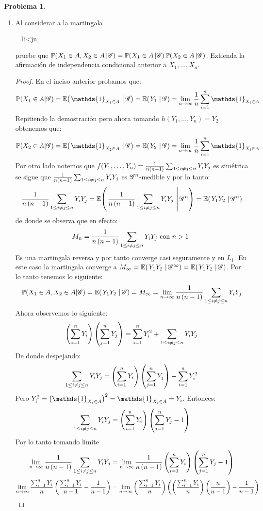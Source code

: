 \documentclass[a5paper,oneside]{amsart}
\theoremstyle{plain}
\theoremstyle{definition}
\newtheorem{problema}{Problema}
\begin{document}
\begin{problema}
\begin{enumerate}
\item Al considerar a la martingala\begin{esn}
\sum_{1\leq i<j\leq n},
\end{esn}pruebe que $\mathbb{P}\! \left( X_1\in A,X_2\in A \, | \mathscr{G} \right)=\mathbb{P}\! \left( X_1\in A \, | \mathscr{G} \right)\mathbb{P}\! \left( X_2\in A \, | \mathscr{G} \right)$. Extienda la afirmaci\'on de independencia condicional anterior a $X_1,\ldots, X_n$. 
\begin{proof}
En el inciso anterior probamos que:
$$
\p(X_1 \in A|\G)=\espc{\mathds{1}_{X_1 \in A}}{\G}=\espc{Y_1}{\G}=\lim_{n \rightarrow \infty}\frac{1}{n}\sum_{i=1}^{n}{\mathds{1}_{X_i \in A}}
$$
Repitiendo la demostraci\'on pero ahora tomando $h(Y_1,\ldots,Y_n)=Y_2$ obtenemos que:
$$
\p(X_2 \in A|\G)=\espc{\mathds{1}_{X_2 \in A}}{\G}=\espc{Y_2}{\G}=\lim_{n \rightarrow \infty}\frac{1}{n}\sum_{i=1}^{n}{\mathds{1}_{X_i \in A}}
$$ 
Por otro lado notemos que $f(Y_1,\ldots,Y_n)=\frac{1}{n\left( n-1\right) }\sum_{1\leq i \neq j\leq n}Y_iY_j$ es sim\'etrica se sigue que $\frac{1}{n\left( n-1\right) }\sum_{1\leq i \neq j\leq n}Y_iY_j$ es $\mathscr{G}^n$-medible y por lo tanto:
$$
\frac{1}{n\paren{n-1}}\sum_{1\leq i \neq j\leq n}Y_iY_j=\espc{\frac{1}{n\paren{n-1}}\sum_{1\leq i \neq j\leq n}Y_iY_j}{\G^n}=\espc{Y_1Y_2}{\G^n}
$$
de donde se observa que en efecto:
$$
M_n=\frac{1}{n\left( n-1\right) }\sum_{1\leq i \neq j\leq n}Y_iY_j \text{    con  $n > 1$ }
$$
Es una martingala reversa y por tanto converge casi seguramente y en $L_1$. En este caso la martingala converge a $M_\infty=\espc{Y_1Y_2}{\G^\infty}=\espc{Y_1Y_2}{\G}$. Por lo tanto tenemos lo siguiente:
$$
\p(X_1 \in A, X_2 \in A|\G)=\espc{Y_1Y_2}{\G}=M_\infty=\lim_{n \rightarrow \infty}\frac{1}{n\paren{n-1}}\sum_{1\leq i \neq j\leq n}Y_iY_j 
$$
Ahora observemos lo siguiente:
$$
\left( \sum_{i=1}^{n}{Y_i}\right) \left( \sum_{j=1}^{n}{Y_j}\right) =\sum_{i=1}^{n}Y_i^2+\sum_{1\leq i \neq j\leq n}Y_iY_j 
$$
De donde despejando:
$$
\sum_{1\leq i \neq j\leq n}Y_iY_j =\left( \sum_{i=1}^{n}{Y_i}\right) \left( \sum_{j=1}^{n}{Y_j}\right) -\sum_{i=1}^{n}Y_i^2
$$
Pero $Y_i^2=\paren{\mathds{1}_{X_i \in A}}^2=\mathds{1}_{X_i \in A}=Y_i$. Entonces:
$$
\sum_{1\leq i \neq j\leq n}Y_iY_j =\left( \sum_{i=1}^{n}{Y_i}\right) \left( \sum_{j=1}^{n}{Y_j}-1\right) 
$$
Por lo tanto tomando limite
$$
\lim_{n \rightarrow \infty}\frac{1}{n\left( n-1\right) }\sum_{1\leq i \neq j\leq n}Y_iY_j =\lim_{n \rightarrow \infty}\frac{1}{n\left( n-1\right) }\left( \sum_{i=1}^{n}{Y_i}\right) \left( \sum_{j=1}^{n}{Y_j}-1\right) 
$$
$$
\lim_{n \rightarrow \infty}\frac{\sum_{i=1}^{n}{Y_i}}{n}\left( \frac{\sum_{i=1}^{n}{Y_i}}{n-1}-\frac{1}{n-1}\right) =\lim_{n \rightarrow \infty}\left( \frac{\sum_{i=1}^{n}{Y_i}}{n}\right) \left( \left( \frac{\sum_{i=1}^{n}{Y_i}}{n}\right) \left( \frac{n}{n-1}\right) -\frac{1}{n-1}\right) 
$$
\end{proof}
\end{enumerate}
\end{problema}
\end{document}
